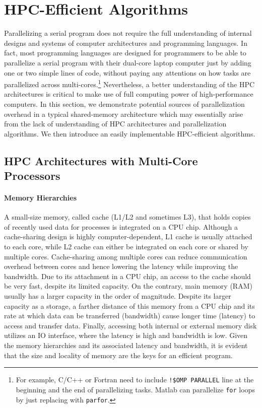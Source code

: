 \documentclass[12pt]{article}
\begin{document}
\clearpage
\section{HPC-Efficient Algorithms}
Parallelizing a serial program does not require the full understanding of internal designs and systems of computer architectures and programming languages. In fact, most programming languages are designed for programmers to be able to parallelize a serial program with their dual-core laptop computer just by adding one or two simple lines of code, without paying any attentions on how tasks are parallelized across multi-cores.\footnote{\sf For example, C/C++ or Fortran need to include \texttt{!\$OMP PARALLEL} line at the beginning and the end of parallelizing tasks. Matlab can parallelize \texttt{for} loops by just replacing with \texttt{parfor}.} Nevertheless, a better understanding of the HPC architectures is critical to make use of full computing power of high-performance computers. In this section, we demonstrate potential sources of parallelization overhead in a typical shared-memory architecture which may essentially arise from the lack of understanding of HPC architectures and parallelization algorithms. We then introduce an easily implementable HPC-efficient algorithms.

\subsection{HPC Architectures with Multi-Core Processors}
\paragraph{Memory Hierarchies}
A small-size memory, called cache (L1/L2 and sometimes L3), that holds copies of recently used data for processes is integrated on a CPU chip. Although a cache-sharing design is highly computer-dependent, L1 cache is usually attached to each core, while L2 cache can either be integrated on each core or shared by multiple cores. Cache-sharing among multiple cores can reduce communication overhead between cores and hence lowering the latency while improving the bandwidth. Due to its attachment in a CPU chip, an access to the cache should be very fast, despite its limited capacity. On the contrary, main memory (RAM) usually has a larger capacity in the order of magnitude. Despite its larger capacity as a storage, a farther distance of this memory from a CPU chip and its rate at which data can be transferred (bandwidth) cause longer time (latency) to access and transfer data. Finally, accessing both internal or external memory disk utilizes an IO interface, where the latency is high and bandwidth is low. Given the memory hierarchies and its associated latency and bandwidth, it is evident that the size and locality of memory are the keys for an efficient program.
\end{document}

